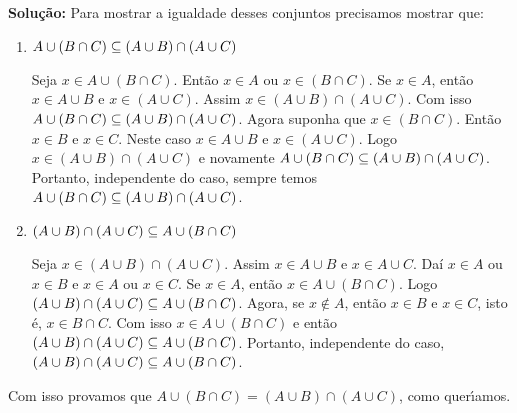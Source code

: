 \documentclass[12pt]{article}
\begin{document}
\noindent\textbf{Solu\c{c}\~ao:} Para mostrar a igualdade desses conjuntos precisamos mostrar que:
\begin{enumerate}[label={\roman*})]
	\item $A \cup ( B \cap C) \subseteq (A \cup B) \cap (A \cup C)$

	Seja $x \in A \cup ( B \cap C)$. Ent\~ao $x \in A$ ou $x \in (B \cap C)$. Se $x \in A$, ent\~ao $x \in A \cup B$ e $x \in (A \cup C)$. Assim $x \in (A \cup B) \cap (A \cup C)$. Com isso $A \cup ( B \cap C) \subseteq (A \cup B) \cap (A \cup C)$. Agora suponha que $x \in (B \cap C)$. Ent\~ao $x \in B$ e $x \in C$. Neste caso $x \in A \cup B$ e $x \in (A \cup C)$. Logo $x \in (A \cup B) \cap (A \cup C)$ e novamente $A \cup ( B \cap C) \subseteq (A \cup B) \cap (A \cup C)$. Portanto, independente do caso, sempre temos $A \cup ( B \cap C) \subseteq (A \cup B) \cap (A \cup C)$.

	\item $(A \cup B) \cap (A \cup C) \subseteq A \cup ( B \cap C)$

	Seja $x \in (A \cup B) \cap (A \cup C)$. Assim $x \in A \cup B$ e $x \in A \cup C$. Daí $x \in A$ ou $x \in B$ e $x \in A$ ou $x \in C$. Se $x \in A$, então $x \in A \cup (B \cap C)$. Logo $(A \cup B) \cap (A \cup C) \subseteq A \cup ( B \cap C)$. Agora, se $x \notin A$, então $x \in B$ e $x \in C$, isto é, $x \in B \cap C$. Com isso $x \in A \cup (B \cap C)$ e então $(A \cup B) \cap (A \cup C) \subseteq A \cup ( B \cap C)$. Portanto, independente do caso, $(A \cup B) \cap (A \cup C) \subseteq A \cup ( B \cap C)$.
\end{enumerate}
Com isso provamos que $A \cup ( B \cap C) = (A \cup B) \cap (A \cup C)$, como quer{\'\i}amos.
\end{document}
